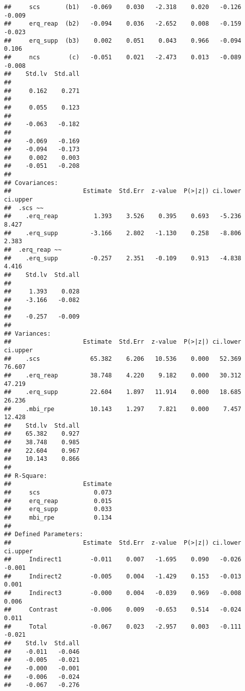 \documentclass[
  english,
  man]{apa6}
\begin{document}
\begin{verbatim}
##     scs       (b1)   -0.069    0.030   -2.318    0.020   -0.126   -0.009
##     erq_reap  (b2)   -0.094    0.036   -2.652    0.008   -0.159   -0.023
##     erq_supp  (b3)    0.002    0.051    0.043    0.966   -0.094    0.106
##     ncs        (c)   -0.051    0.021   -2.473    0.013   -0.089   -0.008
##    Std.lv  Std.all
##                   
##     0.162    0.271
##                   
##     0.055    0.123
##                   
##    -0.063   -0.182
##                   
##    -0.069   -0.169
##    -0.094   -0.173
##     0.002    0.003
##    -0.051   -0.208
## 
## Covariances:
##                    Estimate  Std.Err  z-value  P(>|z|) ci.lower ci.upper
##  .scs ~~                                                                
##    .erq_reap          1.393    3.526    0.395    0.693   -5.236    8.427
##    .erq_supp         -3.166    2.802   -1.130    0.258   -8.806    2.383
##  .erq_reap ~~                                                           
##    .erq_supp         -0.257    2.351   -0.109    0.913   -4.838    4.416
##    Std.lv  Std.all
##                   
##     1.393    0.028
##    -3.166   -0.082
##                   
##    -0.257   -0.009
## 
## Variances:
##                    Estimate  Std.Err  z-value  P(>|z|) ci.lower ci.upper
##    .scs              65.382    6.206   10.536    0.000   52.369   76.607
##    .erq_reap         38.748    4.220    9.182    0.000   30.312   47.219
##    .erq_supp         22.604    1.897   11.914    0.000   18.685   26.236
##    .mbi_rpe          10.143    1.297    7.821    0.000    7.457   12.428
##    Std.lv  Std.all
##    65.382    0.927
##    38.748    0.985
##    22.604    0.967
##    10.143    0.866
## 
## R-Square:
##                    Estimate
##     scs               0.073
##     erq_reap          0.015
##     erq_supp          0.033
##     mbi_rpe           0.134
## 
## Defined Parameters:
##                    Estimate  Std.Err  z-value  P(>|z|) ci.lower ci.upper
##     Indirect1        -0.011    0.007   -1.695    0.090   -0.026   -0.001
##     Indirect2        -0.005    0.004   -1.429    0.153   -0.013    0.001
##     Indirect3        -0.000    0.004   -0.039    0.969   -0.008    0.006
##     Contrast         -0.006    0.009   -0.653    0.514   -0.024    0.011
##     Total            -0.067    0.023   -2.957    0.003   -0.111   -0.021
##    Std.lv  Std.all
##    -0.011   -0.046
##    -0.005   -0.021
##    -0.000   -0.001
##    -0.006   -0.024
##    -0.067   -0.276
\end{verbatim}
\end{document}
